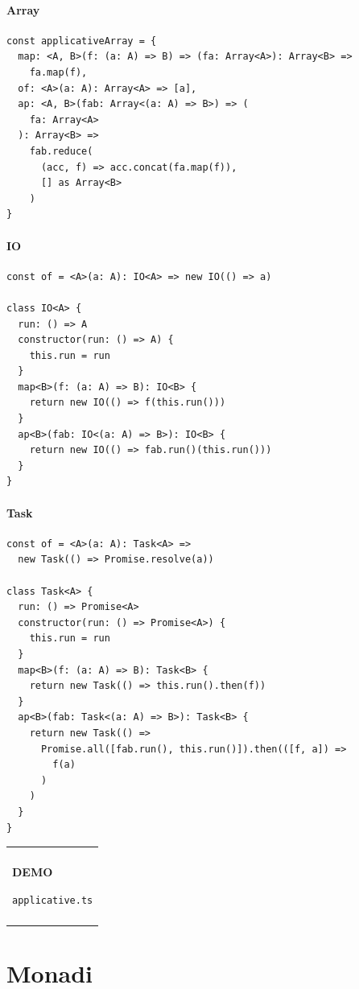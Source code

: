 \documentclass[12pt]{article}
\newenvironment{boxed}
    {\begin{center}
    \begin{tabular}{|p{0.9\textwidth}|}
    \hline\\
    }
    {
    \\\\\hline
    \end{tabular}
    \end{center}
    }
\begin{document}
\paragraph{Array}

\begin{verbatim}
const applicativeArray = {
  map: <A, B>(f: (a: A) => B) => (fa: Array<A>): Array<B> =>
    fa.map(f),
  of: <A>(a: A): Array<A> => [a],
  ap: <A, B>(fab: Array<(a: A) => B>) => (
    fa: Array<A>
  ): Array<B> =>
    fab.reduce(
      (acc, f) => acc.concat(fa.map(f)),
      [] as Array<B>
    )
}
\end{verbatim}

\paragraph{IO}

\begin{verbatim}
const of = <A>(a: A): IO<A> => new IO(() => a)

class IO<A> {
  run: () => A
  constructor(run: () => A) {
    this.run = run
  }
  map<B>(f: (a: A) => B): IO<B> {
    return new IO(() => f(this.run()))
  }
  ap<B>(fab: IO<(a: A) => B>): IO<B> {
    return new IO(() => fab.run()(this.run()))
  }
}
\end{verbatim}

\paragraph{Task}

\begin{verbatim}
const of = <A>(a: A): Task<A> =>
  new Task(() => Promise.resolve(a))

class Task<A> {
  run: () => Promise<A>
  constructor(run: () => Promise<A>) {
    this.run = run
  }
  map<B>(f: (a: A) => B): Task<B> {
    return new Task(() => this.run().then(f))
  }
  ap<B>(fab: Task<(a: A) => B>): Task<B> {
    return new Task(() =>
      Promise.all([fab.run(), this.run()]).then(([f, a]) =>
        f(a)
      )
    )
  }
}
\end{verbatim}

\begin{boxed}
\begin{center}
\textbf{DEMO}

\texttt{applicative.ts}
\end{center}
\end{boxed}

\section{Monadi}
\end{document}
